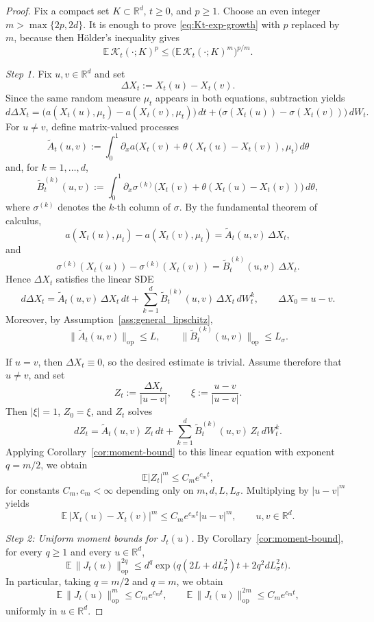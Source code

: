 \documentclass{tsp-short}
\theoremstyle{remark}
\theoremstyle{definition}
\begin{document}
\begin{proof}
Fix a compact set $K\subset\mathbb{R}^d$, $t\ge0$, and $p\ge1$.
Choose an even integer $m>\max\{2p,2d\}$.
It is enough to prove \eqref{eq:Kt-exp-growth} with $p$ replaced by $m$, because then H\"older's inequality gives
\[
\mathbb{E}\,\mathcal{K}_t(\cdot;K)^p
\le
\big(\mathbb{E}\,\mathcal{K}_t(\cdot;K)^m\big)^{p/m}.
\]

\smallskip
\smallskip
\noindent\emph{Step 1.}
Fix \(u,v\in\mathbb{R}^d\) and set
\[
\Delta X_t:=X_t(u)-X_t(v).
\]
Since the same random measure \(\mu_t\) appears in both equations, subtraction yields
\[
d\Delta X_t
=
\big(a(X_t(u),\mu_t)-a(X_t(v),\mu_t)\big)\,dt
+
\big(\sigma(X_t(u))-\sigma(X_t(v))\big)\,dW_t.
\]
For \(u\neq v\), define matrix-valued processes
\[
\widetilde A_t(u,v)
:=
\int_0^1
\partial_x a\big(X_t(v)+\theta(X_t(u)-X_t(v)),\mu_t\big)\,d\theta
\]
and, for \(k=1,\dots,d\),
\[
\widetilde B_t^{(k)}(u,v)
:=
\int_0^1
\partial_x \sigma^{(k)}\big(X_t(v)+\theta(X_t(u)-X_t(v))\big)\,d\theta,
\]
where \(\sigma^{(k)}\) denotes the \(k\)-th column of \(\sigma\).
By the fundamental theorem of calculus,
\[
a(X_t(u),\mu_t)-a(X_t(v),\mu_t)
=
\widetilde A_t(u,v)\,\Delta X_t,
\]
and
\[
\sigma^{(k)}(X_t(u))-\sigma^{(k)}(X_t(v))
=
\widetilde B_t^{(k)}(u,v)\,\Delta X_t.
\]
Hence \(\Delta X_t\) satisfies the linear SDE
\[
d\Delta X_t
=
\widetilde A_t(u,v)\,\Delta X_t\,dt
+
\sum_{k=1}^d \widetilde B_t^{(k)}(u,v)\,\Delta X_t\,dW_t^k,
\qquad
\Delta X_0=u-v.
\]
Moreover, by Assumption~\ref{ass:general_lipschitz},
\[
\|\widetilde A_t(u,v)\|_{\mathrm{op}}\le L,
\qquad
\|\widetilde B_t^{(k)}(u,v)\|_{\mathrm{op}}\le L_\sigma.
\]

If \(u=v\), then \(\Delta X_t\equiv0\), so the desired estimate is trivial. Assume therefore that \(u\neq v\), and set
\[
Z_t:=\frac{\Delta X_t}{|u-v|},
\qquad
\xi:=\frac{u-v}{|u-v|}.
\]
Then \(|\xi|=1\), \(Z_0=\xi\), and \(Z_t\) solves
\[
dZ_t
=
\widetilde A_t(u,v)\,Z_t\,dt
+
\sum_{k=1}^d \widetilde B_t^{(k)}(u,v)\,Z_t\,dW_t^k.
\]
Applying Corollary~\ref{cor:moment-bound} to this linear equation with exponent \(q=m/2\), we obtain
\[
\mathbb{E}|Z_t|^m
\le
C_m e^{c_m t},
\]
for constants \(C_m,c_m<\infty\) depending only on \(m,d,L,L_\sigma\).
Multiplying by \(|u-v|^m\) yields
\begin{equation}\label{eq:DX-moment-fullproof}
\mathbb{E}\,|X_t(u)-X_t(v)|^m
\le
C_m e^{c_m t}|u-v|^m,
\qquad u,v\in\mathbb{R}^d.
\end{equation}




\smallskip
\noindent\emph{Step 2: Uniform moment bounds for $J_t(u)$.}
By Corollary~\ref{cor:moment-bound}, for every $q\ge1$ and every $u\in\mathbb{R}^d$,
\[
\mathbb{E}\,\|J_t(u)\|_{\mathrm{op}}^{2q}
\le d^q \exp\Big(q(2L+dL_\sigma^2)t+2q^2 dL_\sigma^2 t\Big).
\]
In particular, taking $q=m/2$ and $q=m$, we obtain
\begin{equation}\label{eq:J-moment-fullproof}
\mathbb{E}\,\|J_t(u)\|_{\mathrm{op}}^m
\le C_m e^{c_m t},
\qquad
\mathbb{E}\,\|J_t(u)\|_{\mathrm{op}}^{2m}
\le C_m e^{c_m t},
\end{equation}
uniformly in $u\in\mathbb{R}^d$.





\end{proof}
\end{document}

